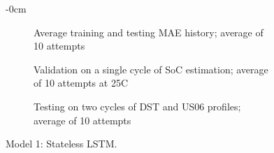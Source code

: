 \begin{figure}[H]
\begin{adjustwidth}{-\extralength}{0cm}
    \begin{subfigure}[b]{0.425\textwidth}
        \centering
        
        \caption{Average training and testing MAE history; average of 10 attempts}
    \end{subfigure}
    \hfill
    \begin{subfigure}[b]{0.425\textwidth}
        \centering
        
        \caption{Validation on a single cycle of SoC estimation; average of 10 attempts at 25\textdegree{}C}
    \end{subfigure}
    \hfill
    \begin{subfigure}[b]{0.425\textwidth}
        \centering
        
        \caption{Testing on two cycles of DST and US06 profiles; average of 10 attempts}
    \end{subfigure}
    \caption{Model 1: Stateless LSTM.}
    \label{fig:Model-1res}
    \end{adjustwidth}
\end{figure}
\clearpage
